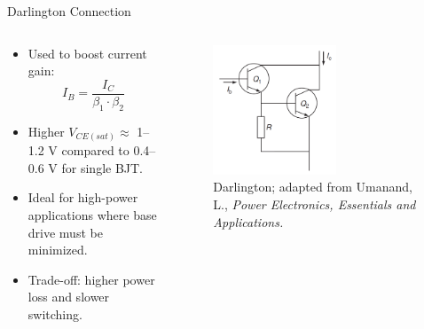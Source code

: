 \begin{frame}{Darlington Connection}
            \begin{columns}
        \begin{column}{0.5\textwidth}
\begin{itemize}
  \item Used to boost current gain:
  \[
  I_B = \frac{I_C}{\beta_1 \cdot \beta_2}
  \]
  \item Higher $V_{CE(sat)} \approx$ 1–1.2 V compared to 0.4–0.6 V for single BJT.
  \item Ideal for high-power applications where base drive must be minimized.
  \item Trade-off: higher power loss and slower switching.
\end{itemize}
        \end{column}

\begin{column}{0.5\textwidth}
\begin{figure}
\centering
\includegraphics[width=0.6\textwidth]{fig/lec04/darlington_BJTs.png}
\caption{Darlington; adapted from Umanand, L., \textit{Power Electronics, Essentials and Applications.}}
\label{fig:bjt_on_state_losses}
\end{figure}
    \end{column}
    \end{columns}
\end{frame}